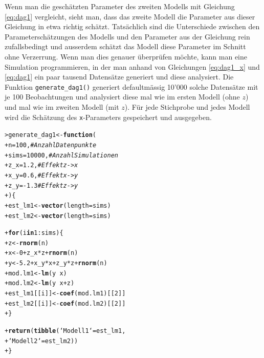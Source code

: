 \documentclass[oneside, 10pt]{book}\usepackage[]{graphicx}\usepackage[]{xcolor}
\makeatletter
\newcommand{\hlnum}[1]{\textcolor[rgb]{0.686,0.059,0.569}{#1}}%
\newcommand{\hlcom}[1]{\textcolor[rgb]{0.678,0.584,0.686}{\textit{#1}}}%
\newcommand{\hlopt}[1]{\textcolor[rgb]{0,0,0}{#1}}%
\newcommand{\hlstd}[1]{\textcolor[rgb]{0.345,0.345,0.345}{#1}}%
\newcommand{\hlkwa}[1]{\textcolor[rgb]{0.161,0.373,0.58}{\textbf{#1}}}%
\newcommand{\hlkwb}[1]{\textcolor[rgb]{0.69,0.353,0.396}{#1}}%
\newcommand{\hlkwc}[1]{\textcolor[rgb]{0.333,0.667,0.333}{#1}}%
\newcommand{\hlkwd}[1]{\textcolor[rgb]{0.737,0.353,0.396}{\textbf{#1}}}%
\newenvironment{kframe}{%
 \def\at@end@of@kframe{}%
 \ifinner\ifhmode%
  \def\at@end@of@kframe{\end{minipage}}%
  \begin{minipage}{\columnwidth}%
 \fi\fi%
 \def\FrameCommand##1{\hskip\@totalleftmargin \hskip-\fboxsep
 \colorbox{shadecolor}{##1}\hskip-\fboxsep
     \hskip-\linewidth \hskip-\@totalleftmargin \hskip\columnwidth}%
 \MakeFramed {\advance\hsize-\width
   \@totalleftmargin\z@ \linewidth\hsize
   \@setminipage}}%
 {\par\unskip\endMakeFramed%
 \at@end@of@kframe}
\newenvironment{knitrout}{}{} %
\makeatother
\begin{document}
Wenn man die geschätzten Parameter des zweiten Modells mit Gleichung \vref{eq:dag1}
vergleicht, sieht man, dass das zweite Modell die Parameter aus dieser
Gleichung in etwa richtig schätzt. Tatsächlich sind die Unterschiede zwischen
den Parameterschätzungen des Modells und den Parameter aus der Gleichung
rein zufallsbedingt und ausserdem schätzt das Modell diese Parameter im Schnitt
ohne Verzerrung. Wenn man dies genauer überprüfen möchte, kann man eine Simulation
programmieren, in der man anhand von Gleichungen \ref{eq:dag1_x} und \ref{eq:dag1}
ein paar tausend Datensätze generiert und diese analysiert.
Die Funktion \texttt{generate\_dag1()} generiert defaultmässig
10'000 solche Datensätze mit je 100 Beobachtungen
und analysiert diese mal wie im ersten Modell (ohne $z$)
und mal wie im zweiten Modell (mit $z$). Für jede Stichprobe und jedes Modell
wird die Schätzung des \texttt{x}-Parameters gespeichert und ausgegeben.

\begin{knitrout}
\color{fgcolor}\begin{kframe}
\begin{alltt}
\hlstd{> }\hlstd{generate_dag1} \hlkwb{<-} \hlkwa{function}\hlstd{(}
\hlstd{+ }  \hlkwc{n} \hlstd{=} \hlnum{100}\hlstd{,}      \hlcom{# Anzahl Datenpunkte}
\hlstd{+ }  \hlkwc{sims} \hlstd{=} \hlnum{10000}\hlstd{,} \hlcom{# Anzahl Simulationen}
\hlstd{+ }  \hlkwc{z_x} \hlstd{=} \hlnum{1.2}\hlstd{,}    \hlcom{# Effekt z -> x}
\hlstd{+ }  \hlkwc{x_y} \hlstd{=} \hlnum{0.6}\hlstd{,}    \hlcom{# Effekt x -> y}
\hlstd{+ }  \hlkwc{z_y} \hlstd{=} \hlopt{-}\hlnum{1.3}    \hlcom{# Effekt z -> y}
\hlstd{+ }\hlstd{) \{}
\hlstd{+ }  \hlstd{est_lm1} \hlkwb{<-} \hlkwd{vector}\hlstd{(}\hlkwc{length} \hlstd{= sims)}
\hlstd{+ }  \hlstd{est_lm2} \hlkwb{<-} \hlkwd{vector}\hlstd{(}\hlkwc{length} \hlstd{= sims)}

\hlstd{+ }  \hlkwa{for} \hlstd{(i} \hlkwa{in} \hlnum{1}\hlopt{:}\hlstd{sims) \{}
\hlstd{+ }    \hlstd{z} \hlkwb{<-} \hlkwd{rnorm}\hlstd{(n)}
\hlstd{+ }    \hlstd{x} \hlkwb{<-} \hlnum{0} \hlopt{+} \hlstd{z_x}\hlopt{*}\hlstd{z} \hlopt{+} \hlkwd{rnorm}\hlstd{(n)}
\hlstd{+ }    \hlstd{y} \hlkwb{<-} \hlnum{5.2} \hlopt{+} \hlstd{x_y}\hlopt{*}\hlstd{x} \hlopt{+} \hlstd{z_y}\hlopt{*}\hlstd{z} \hlopt{+} \hlkwd{rnorm}\hlstd{(n)}
\hlstd{+ }    \hlstd{mod.lm1} \hlkwb{<-} \hlkwd{lm}\hlstd{(y} \hlopt{~} \hlstd{x)}
\hlstd{+ }    \hlstd{mod.lm2} \hlkwb{<-} \hlkwd{lm}\hlstd{(y} \hlopt{~} \hlstd{x} \hlopt{+} \hlstd{z)}
\hlstd{+ }    \hlstd{est_lm1[[i]]} \hlkwb{<-} \hlkwd{coef}\hlstd{(mod.lm1)[[}\hlnum{2}\hlstd{]]}
\hlstd{+ }    \hlstd{est_lm2[[i]]} \hlkwb{<-} \hlkwd{coef}\hlstd{(mod.lm2)[[}\hlnum{2}\hlstd{]]}
\hlstd{+ }  \hlstd{\}}

\hlstd{+ }  \hlkwd{return}\hlstd{(}\hlkwd{tibble}\hlstd{(}\hlkwc{`Modell 1`} \hlstd{= est_lm1,}
\hlstd{+ }                \hlkwc{`Modell 2`} \hlstd{= est_lm2))}
\hlstd{+ }\hlstd{\}}
\end{alltt}
\end{kframe}
\end{knitrout}
\end{document}
